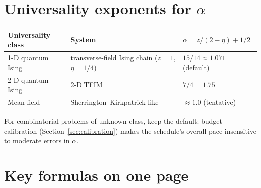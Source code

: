 \section{Universality exponents for \texorpdfstring{$\alpha$}{alpha}}

\begin{center}
\small
\begin{tabular}{@{}lll@{}}
\toprule
\textbf{Universality class} & \textbf{System} & $\alpha=z/(2-\eta)+1/2$\\
\midrule
1-D quantum Ising & transverse-field Ising chain ($z=1$, $\eta=1/4$) &
$15/14\approx1.071$ (default)\\
2-D quantum Ising & 2-D TFIM & $7/4=1.75$\\
Mean-field & Sherrington--Kirkpatrick-like & $\approx1.0$ (tentative)\\
\bottomrule
\end{tabular}
\end{center}

For combinatorial problems of unknown class, keep the default: budget
calibration (Section~\ref{sec:calibration}) makes the schedule's overall
pace insensitive to moderate errors in $\alpha$.

\section{Key formulas on one page}

